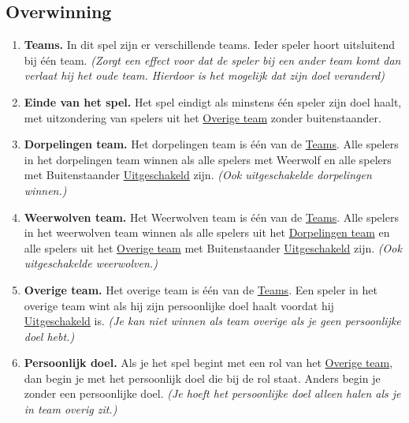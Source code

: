 \documentclass{article}
\newenvironment{rulesubsection}[1]{
    \subsection{#1} \label{rule:#1}
    \begin{enumerate}[label=\thesubsection.\arabic{enumi}]
}{
    \end{enumerate}
}
\newcommand{\ruleitem}[1]{\item \label{rule:#1} \textbf{#1.}}
\newcommand{\ruleref}[1]{\hyperref[rule:#1]{#1}}
\begin{document}
\begin{rulesubsection}{Overwinning}
    \ruleitem{Teams} In dit spel zijn er verschillende teams. Ieder speler hoort uitsluitend bij één team.
    \textit{(Zorgt een effect voor dat de speler bij een ander team komt dan verlaat hij het oude team.
    Hierdoor is het mogelijk dat zijn doel veranderd)}
    \ruleitem{Einde van het spel} Het spel eindigt als minstens één speler zijn doel haalt, met uitzondering van spelers uit het \ruleref{Overige team}
    zonder buitenstaander.
    \ruleitem{Dorpelingen team} Het dorpelingen team is één van de \ruleref{Teams}. Alle spelers in het dorpelingen team winnen als alle spelers met
    Weerwolf en alle spelers met Buitenstaander \ruleref{Uitgeschakeld} zijn. \textit{(Ook uitgeschakelde dorpelingen winnen.)}
    \ruleitem{Weerwolven team} Het Weerwolven team is één van de \ruleref{Teams}. Alle spelers in het weerwolven team winnen als alle spelers
    uit het \ruleref{Dorpelingen team} en alle spelers uit het \ruleref{Overige team} met Buitenstaander \ruleref{Uitgeschakeld} zijn. \textit{(Ook uitgeschakelde weerwolven.)}
    \ruleitem{Overige team} Het overige team is één van de \ruleref{Teams}. Een speler in het overige team wint als hij zijn persoonlijke doel 
    haalt voordat hij \ruleref{Uitgeschakeld} is. \textit{(Je kan niet winnen als team overige als je geen persoonlijke doel hebt.)}
    \ruleitem{Persoonlijk doel} Als je het spel begint met een rol van het \ruleref{Overige team}, dan begin je met het persoonlijk doel die bij de rol staat.
    Anders begin je zonder een persoonlijke doel. \textit{(Je hoeft het persoonlijke doel alleen halen als je in team overig zit.)}
\end{rulesubsection}
\end{document}
